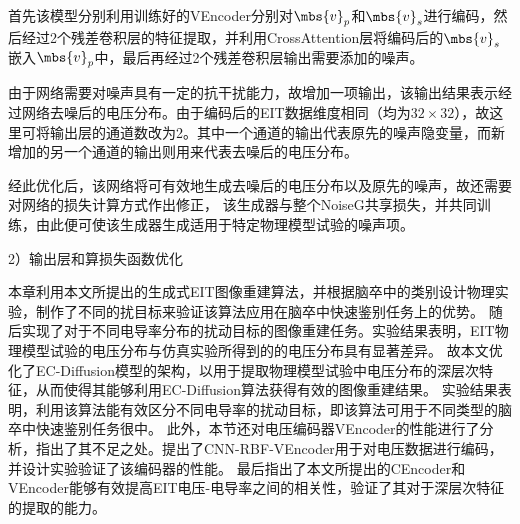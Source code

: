 首先该模型分别利用训练好的VEncoder分别对$\mbs{v}_p$和$\mbs{v}_s$进行编码，然后经过2个残差卷积层的特征提取，并利用CrossAttention层将编码后的$\mbs{v}_s$嵌入$\mbs{v}_p$中，最后再经过2个残差卷积层输出需要添加的噪声。
 
由于网络需要对噪声具有一定的抗干扰能力，故增加一项输出，该输出结果表示经过网络去噪后的电压分布。由于编码后的EIT数据维度相同（均为$32\times 32$），故这里可将输出层的通道数改为2。其中一个通道的输出代表原先的噪声隐变量，而新增加的另一个通道的输出则用来代表去噪后的电压分布。

经此优化后，该网络将可有效地生成去噪后的电压分布以及原先的噪声，故还需要对网络的损失计算方式作出修正，
该生成器与整个NoiseG共享损失，并共同训练，由此便可使该生成器生成适用于特定物理模型试验的噪声项。
 
2）输出层和算损失函数优化






本章利用本文所提出的生成式EIT图像重建算法，并根据脑卒中的类别设计物理实验，制作了不同的扰目标来验证该算法应用在脑卒中快速鉴别任务上的优势。
随后实现了对于不同电导率分布的扰动目标的图像重建任务。实验结果表明，EIT物理模型试验的电压分布与仿真实验所得到的的电压分布具有显著差异。
故本文优化了EC-Diffusion模型的架构，以用于提取物理模型试验中电压分布的深层次特征，从而使得其能够利用EC-Diffusion算法获得有效的图像重建结果。
实验结果表明，利用该算法能有效区分不同电导率的扰动目标，即该算法可用于不同类型的脑卒中快速鉴别任务很中。
此外，本节还对电压编码器VEncoder的性能进行了分析，指出了其不足之处。提出了CNN-RBF-VEncoder用于对电压数据进行编码，并设计实验验证了该编码器的性能。
最后指出了本文所提出的CEncoder和VEncoder能够有效提高EIT电压-电导率之间的相关性，验证了其对于深层次特征的提取的能力。

